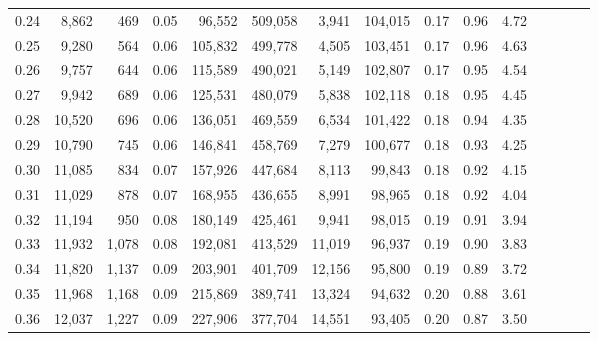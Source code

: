 \begin{tabular}{rrrcrrrrrrrrrrr}
0.24 &   8,862 &    469 &                                       0.05 &   96,552 &  509,058 &    3,941 &  104,015 &  0.17 &  0.96 &                         4.72 \\
0.25 &   9,280 &    564 &                                       0.06 &  105,832 &  499,778 &    4,505 &  103,451 &  0.17 &  0.96 &                         4.63 \\
0.26 &   9,757 &    644 &                                       0.06 &  115,589 &  490,021 &    5,149 &  102,807 &  0.17 &  0.95 &                         4.54 \\
0.27 &   9,942 &    689 &                                       0.06 &  125,531 &  480,079 &    5,838 &  102,118 &  0.18 &  0.95 &                         4.45 \\
0.28 &  10,520 &    696 &                                       0.06 &  136,051 &  469,559 &    6,534 &  101,422 &  0.18 &  0.94 &                         4.35 \\
0.29 &  10,790 &    745 &                                       0.06 &  146,841 &  458,769 &    7,279 &  100,677 &  0.18 &  0.93 &                         4.25 \\
0.30 &  11,085 &    834 &                                       0.07 &  157,926 &  447,684 &    8,113 &   99,843 &  0.18 &  0.92 &                         4.15 \\
0.31 &  11,029 &    878 &                                       0.07 &  168,955 &  436,655 &    8,991 &   98,965 &  0.18 &  0.92 &                         4.04 \\
0.32 &  11,194 &    950 &                                       0.08 &  180,149 &  425,461 &    9,941 &   98,015 &  0.19 &  0.91 &                         3.94 \\
0.33 &  11,932 &  1,078 &                                       0.08 &  192,081 &  413,529 &   11,019 &   96,937 &  0.19 &  0.90 &                         3.83 \\
0.34 &  11,820 &  1,137 &                                       0.09 &  203,901 &  401,709 &   12,156 &   95,800 &  0.19 &  0.89 &                         3.72 \\
0.35 &  11,968 &  1,168 &                                       0.09 &  215,869 &  389,741 &   13,324 &   94,632 &  0.20 &  0.88 &                         3.61 \\
0.36 &  12,037 &  1,227 &                                       0.09 &  227,906 &  377,704 &   14,551 &   93,405 &  0.20 &  0.87 &                         3.50 \\

\end{tabular}
